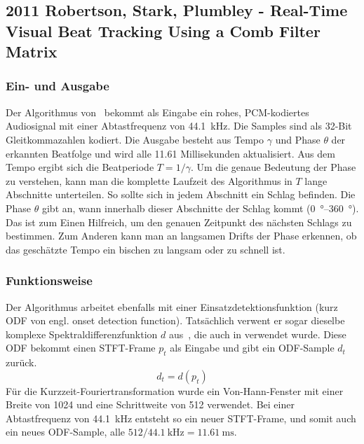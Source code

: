 {	\subsection{2011 Robertson, Stark, Plumbley - Real-Time Visual Beat Tracking Using a Comb Filter Matrix}
	{
		\subsubsection*{Ein- und Ausgabe}
		{
			Der Algorithmus von~\cite{2011_PlRoSt} bekommt als Eingabe ein rohes, PCM-kodiertes Audiosignal mit einer Abtastfrequenz von \SI{44.1}{\kilo\hertz}.
			Die Samples sind als 32-Bit Gleitkommazahlen kodiert.
			Die Ausgabe besteht aus Tempo $\gamma$ und Phase $\theta$ der erkannten Beatfolge
				und wird alle \num{11.61} Millisekunden aktualisiert.
			Aus dem Tempo ergibt sich die Beatperiode $T = 1 / \gamma$.
			Um die genaue Bedeutung der Phase zu verstehen,
				kann man die komplette Laufzeit des Algorithmus in $T$ lange Abschnitte unterteilen.
			So sollte sich in jedem Abschnitt ein Schlag befinden.
			Die Phase $\theta$ gibt an,
				wann innerhalb dieser Abschnitte der Schlag kommt (\SIrange{0}{360}{\degree}).
			Das ist zum Einen Hilfreich,
				um den genauen Zeitpunkt des nächsten Schlags zu bestimmen.
			Zum Anderen kann man an langsamen Drifts der Phase erkennen,
				ob das geschätzte Tempo ein bischen zu langsam oder zu schnell ist.
		}

		\subsubsection*{Funktionsweise}
		{
			Der Algorithmus  arbeitet ebenfalls mit einer Einsatzdetektionsfunktion (kurz ODF von engl. onset detection function).
			Tatsächlich verwent er sogar dieselbe komplexe Spektraldifferenzfunktion $d$ aus~\cite{2004_BeDaDuSa},
				die auch in \cite{2009_DaPlSt} verwendet wurde.
			Diese ODF bekommt einen STFT-Frame $p_t$ als Eingabe und gibt ein ODF-Sample $d_t$ zurück.
			\begin{equation}
				d_t = d(p_t)
			\end{equation}
			Für die Kurzzeit-Fouriertransformation wurde ein Von-Hann-Fenster mit einer Breite von \num{1024} und eine Schrittweite von \num{512} verwendet.
			Bei einer Abtastfrequenz von \SI{44.1}{\kilo\hertz} entsteht so ein neuer STFT-Frame,
				und somit auch ein neues ODF-Sample,
				alle $512 / \SI{44.1}{\kilo\hertz} = \SI{11.61}{\milli\second}$.

}}}
